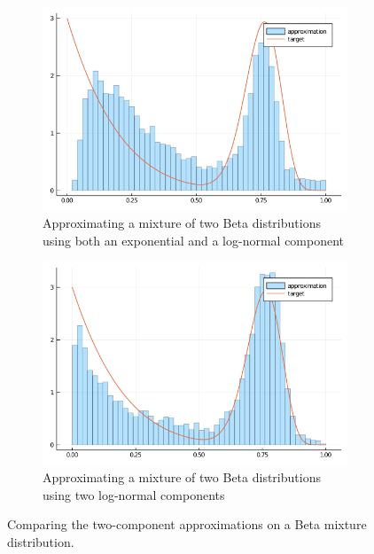 \begin{figure}[H]
\centering
\begin{subfigure}{0.45\textwidth}
\includegraphics[width=1\linewidth]{../../plot/both_multiple.png}
\caption{Approximating a mixture of two Beta distributions using both an exponential and a log-normal component}
\end{subfigure}
\begin{subfigure}{0.45\textwidth}
\includegraphics[width=1\linewidth]{../../plot/gauss_multiple.png}
\caption{Approximating a mixture of two Beta distributions using two log-normal components}
\end{subfigure}
\caption{Comparing the two-component approximations on a Beta mixture distribution.}
\end{figure}